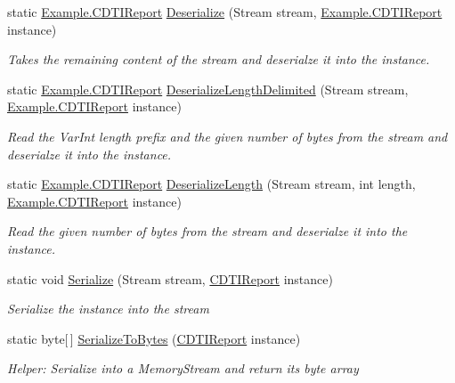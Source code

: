 \begin{DoxyCompactItemize}
static \hyperlink{class_example_1_1_c_d_t_i_report}{Example.\+C\+D\+T\+I\+Report} \hyperlink{class_example_1_1_c_d_t_i_report_a3259ef658ecda5587d8f394849544307}{Deserialize} (Stream stream, \hyperlink{class_example_1_1_c_d_t_i_report}{Example.\+C\+D\+T\+I\+Report} instance)
\begin{DoxyCompactList}\small\item\em Takes the remaining content of the stream and deserialze it into the instance.\end{DoxyCompactList}\item 
static \hyperlink{class_example_1_1_c_d_t_i_report}{Example.\+C\+D\+T\+I\+Report} \hyperlink{class_example_1_1_c_d_t_i_report_a837fd35c86c5ecd43a9ec5b149a37c2b}{Deserialize\+Length\+Delimited} (Stream stream, \hyperlink{class_example_1_1_c_d_t_i_report}{Example.\+C\+D\+T\+I\+Report} instance)
\begin{DoxyCompactList}\small\item\em Read the Var\+Int length prefix and the given number of bytes from the stream and deserialze it into the instance.\end{DoxyCompactList}\item 
static \hyperlink{class_example_1_1_c_d_t_i_report}{Example.\+C\+D\+T\+I\+Report} \hyperlink{class_example_1_1_c_d_t_i_report_a6842f35b509032e593cac6721c53dc3f}{Deserialize\+Length} (Stream stream, int length, \hyperlink{class_example_1_1_c_d_t_i_report}{Example.\+C\+D\+T\+I\+Report} instance)
\begin{DoxyCompactList}\small\item\em Read the given number of bytes from the stream and deserialze it into the instance.\end{DoxyCompactList}\item 
static void \hyperlink{class_example_1_1_c_d_t_i_report_aa35a297b34ae5b717ad4a35b3d43dfaf}{Serialize} (Stream stream, \hyperlink{class_example_1_1_c_d_t_i_report}{C\+D\+T\+I\+Report} instance)
\begin{DoxyCompactList}\small\item\em Serialize the instance into the stream\end{DoxyCompactList}\item 
static byte\mbox{[}$\,$\mbox{]} \hyperlink{class_example_1_1_c_d_t_i_report_a45ad424e439e8f5cea9306fdf40886ba}{Serialize\+To\+Bytes} (\hyperlink{class_example_1_1_c_d_t_i_report}{C\+D\+T\+I\+Report} instance)
\begin{DoxyCompactList}\small\item\em Helper\+: Serialize into a Memory\+Stream and return its byte array\end{DoxyCompactList}\item 

\end{DoxyCompactItemize}
